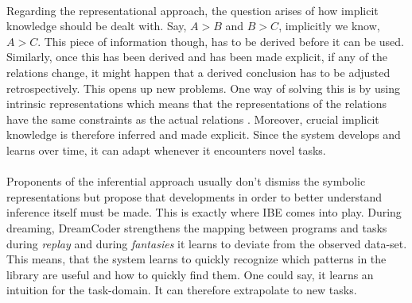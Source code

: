 \paragraph{} Regarding the representational approach, the question arises of how implicit knowledge should be dealt with. Say, $A > B$ and $B > C$, implicitly we know, $A > C$. This piece of information though, has to be derived before it can be used. Similarly, once this has been derived and has been made explicit, if any of the relations change, it might happen that a derived conclusion has to be adjusted retrospectively. This opens up new problems. One way of solving this is by using intrinsic representations which means that the representations of the relations have the same constraints as the actual relations \cite{palmer1978fundamental}. 
 Moreover, crucial implicit knowledge is therefore inferred and made explicit. Since the system develops and learns over time, it can adapt whenever it encounters novel tasks.

\paragraph{} Proponents of the inferential approach usually don't dismiss the symbolic representations but propose that developments in order to better understand inference itself must be made. This is exactly where IBE comes into play. During dreaming, DreamCoder strengthens the mapping between programs and tasks during \emph{replay} and during \emph{fantasies} it learns to deviate from the observed data-set. This means, that the system learns to quickly recognize which patterns in the library are useful and how to quickly find them. One could say, it learns an intuition for the task-domain. It can therefore extrapolate to new tasks.

